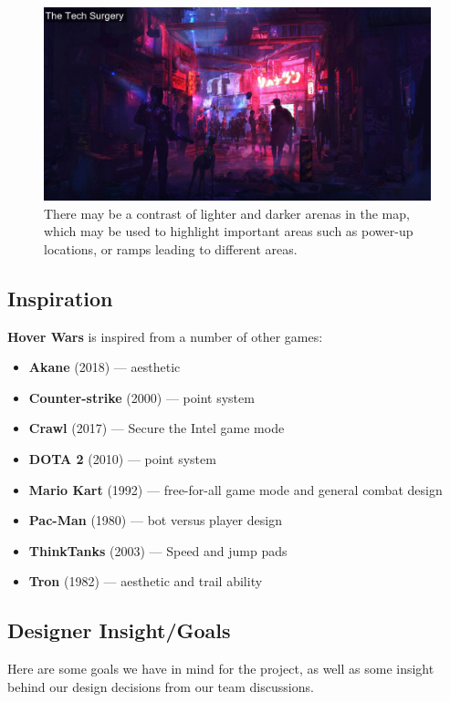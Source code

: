 \documentclass{article}
\newcommand{\namenobold}{Hover Wars}
\newcommand{\name}{\textbf{\namenobold}}
\theoremstyle{definition}
\begin{document}
\begin{figure}[htpb]
  \centering
  \includegraphics[width=0.8\linewidth]{theme03.jpg}
  \caption{There may be a contrast of lighter and darker arenas in the map,
  which may be used to highlight important areas such as power-up locations, or
ramps leading to different areas.}
\label{fig:theme03}
\end{figure}

\subsection{Inspiration}

\name{} is inspired from a number of other games:
\begin{itemize}
  \item \textbf{Akane} (2018) --- aesthetic
  \item \textbf{Counter-strike} (2000) --- point system
  \item \textbf{Crawl} (2017) --- Secure the Intel game mode
  \item \textbf{DOTA 2} (2010) --- point system
  \item \textbf{Mario Kart} (1992) --- free-for-all game mode and general combat design
  \item \textbf{Pac-Man} (1980) --- bot versus player design
  \item \textbf{ThinkTanks} (2003) --- Speed and jump pads
  \item \textbf{Tron} (1982) --- aesthetic and trail ability
\end{itemize}

\subsection{Designer Insight/Goals}

Here are some goals we have in mind for the project, as well as some insight
behind our design decisions from our team discussions.
\end{document}
